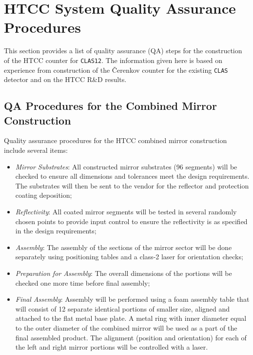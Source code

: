 \section{HTCC System Quality Assurance Procedures}

This section provides a list of quality assurance (QA) steps for the 
construction of the HTCC counter for {\tt CLAS12}.  The information
given here is based on experience from construction of the {\v C}erenkov 
counter for the existing {\tt CLAS} detector and on the HTCC R\&D results.

\subsection{QA Procedures for the Combined Mirror Construction}

Quality assurance procedures for the HTCC combined mirror construction
include several items:

\begin{itemize}

\item {\it Mirror Substrates}: All constructed mirror substrates (96 
segments) will be checked to ensure all dimensions and tolerances meet
the design requirements.  The substrates will then be sent to the vendor
for the reflector and protection coating deposition;

\item {\it Reflectivity}: All coated mirror segments will be tested in 
several randomly chosen points to provide input control to ensure the
reflectivity is as specified in the design requirements;

\item {\it Assembly}: The assembly of the sections of the mirror sector 
will be done separately using positioning tables and a class-2 laser for 
orientation checks;

\item {\it Preparation for Assembly}: The overall dimensions of the portions 
will be checked one more time before final assembly;

\item {\it Final Assembly}: Assembly will be performed using a foam
assembly table that will consist of 12 separate identical portions of 
smaller size, aligned and attached to the flat metal base plate.  A metal 
ring with inner diameter equal to the outer diameter of the combined mirror 
will be used as a part of the final assembled product.  The alignment 
(position and orientation) for each of the left and right mirror portions 
will be controlled with a laser.

\end{itemize}

